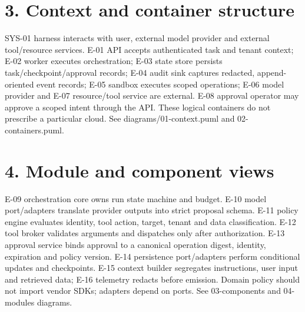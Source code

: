 \documentclass[11pt,letterpaper]{article}
\begin{document}
\section*{3. Context and container structure}
SYS-01 harness interacts with user, external model provider and external tool/resource services. E-01 API accepts authenticated task and tenant context; E-02 worker executes orchestration; E-03 state store persists task/checkpoint/approval records; E-04 audit sink captures redacted, append-oriented event records; E-05 sandbox executes scoped operations; E-06 model provider and E-07 resource/tool service are external. E-08 approval operator may approve a scoped intent through the API. These logical containers do not prescribe a particular cloud. See diagrams/01-context.puml and 02-containers.puml.\par\smallskip
\section*{4. Module and component views}
E-09 orchestration core owns run state machine and budget. E-10 model port/adapters translate provider outputs into strict proposal schema. E-11 policy engine evaluates identity, tool action, target, tenant and data classification. E-12 tool broker validates arguments and dispatches only after authorization. E-13 approval service binds approval to a canonical operation digest, identity, expiration and policy version. E-14 persistence port/adapters perform conditional updates and checkpoints. E-15 context builder segregates instructions, user input and retrieved data; E-16 telemetry redacts before emission. Domain policy should not import vendor SDKs; adapters depend on ports. See 03-components and 04-modules diagrams.\par\smallskip
\end{document}
